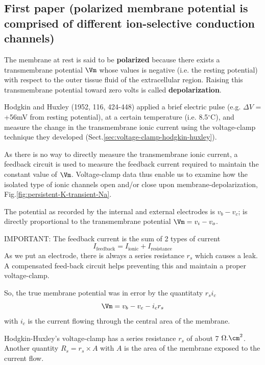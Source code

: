\subsection{First paper (polarized membrane potential is comprised of
different ion-selective conduction channels)}
\label{sec:Hodgkin-Huxley-1st-paper}

The membrane  at  rest  is said  to  be {\bf polarized} because there exists a
transmembrane potential $\Vm$ whose values is  negative  (i.e. the resting
potential) with respect to the outer tissue fluid of the extracellular region.
Raising this transmembrane potential toward zero volts is called {\bf
depolarization}.

Hodgkin and Huxley (1952, 116, 424-448) applied a brief electric pulse (e.g.
$\Delta V$ = +56mV from resting potential), at a certain temperature (i.e.
8.5$^\circ$C), and measure the change in the transmembrane ionic current using
the voltage-clamp technique they developed
(Sect.\ref{sec:voltage-clamp-hodgkin-huxley}). 

\begin{mdframed}
As there is no way to directly
measure the transmembrane ionic current, a feedback circuit is used to measure
the feedback current required to maintain the constant value of $\Vm$.
Voltage-clamp data thus enable us to examine how the isolated type of ionic
channels open and/or close upon membrane-depolarization,
Fig.\ref{fig:persistent-K-transient-Na}.

The potential as recorded by the internal and external electrodes is $v_b-v_c$;
is directly proportional to the transmembrane potential $\Vm = v_i - v_o$.

IMPORTANT: The feedback current is the sum of 2 types of current
\begin{equation}
I_\text{feedback} = I_{\text{ionic}} + I_{\text{resistance}}
\end{equation}
As we put an electrode, there is always a series resistance $r_s$ which causes
a leak. A compensated feed-back circuit helps preventing this and maintain a
proper voltage-clamp.

So, the true membrane potential was in error by the quantitaty $r_s i_c$
\begin{equation}
\Vm = v_b - v_c - i_c r_s
\end{equation}
with $i_c$ is the current flowing through the central area of the membrane.

Hodgkin-Huxley's voltage-clamp has a series resistance $r_s$ of about 7
$\Omega.\cm^2$. Another quantity $R_s = r_s \times A$ with $A$ is the area of
the membrane exposed to the current flow.
\end{mdframed}

